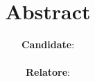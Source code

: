 \title{\vspace*{-5mm}\textbf{\thesistitle}\\Abstract} %
\date{\thesisdate}
\author{\textbf{Candidate}:\\\thesiscandidatename~\thesiscandidatesurname\\
\textbf{Relatore}:\\\thesissupervisoronetitle~\thesissupervisoronename~\thesissupervisoronesurname\\
\thesissupervisortwotitle~\thesissupervisortwoname~\thesissupervisortwosurname\\
\thesissupervisorthreetitle~\thesissupervisorthreename~\thesissupervisorthreesurname}
